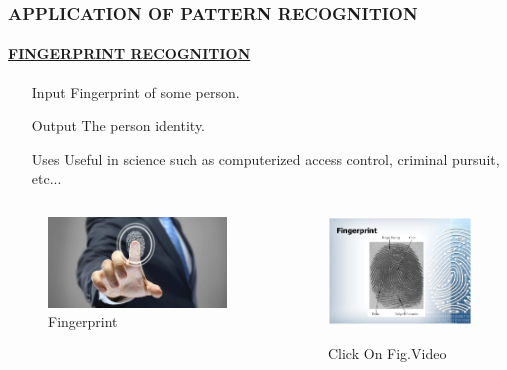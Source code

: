\documentclass{beamer}
\begin{document}
\begin{frame}

\frametitle{APPLICATION OF PATTERN RECOGNITION}\pause
\framesubtitle{\underline{FINGERPRINT RECOGNITION}}\pause
 \begin{itemize}
 \item[Input] Fingerprint of some person.\pause
 \item[Output] The person identity.\pause
 \item[Uses] Useful in science such as computerized access control, criminal pursuit, etc...\pause
 \end{itemize}
 \begin{columns}
 \begin{column}{.65\textwidth}
\begin{figure}
\includegraphics[width=.65\textwidth]{fing.jpg}
\caption{Fingerprint}\pause
\end{figure} 
 \end{column}
 \begin{column}{.5\textwidth}
 \begin{figure}
\href{run:fingure.mp4}{\includegraphics[width=.5\textwidth]{fin.jpg}} 
 
\caption{Click On Fig.Video}\pause
\end{figure} 
 \end{column}
\end{columns}
\end{frame}
\end{document}

